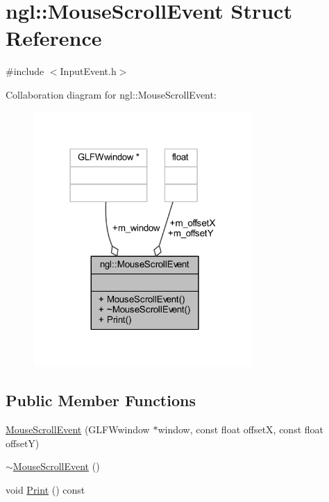 \hypertarget{structngl_1_1_mouse_scroll_event}{}\section{ngl\+:\+:Mouse\+Scroll\+Event Struct Reference}
\label{structngl_1_1_mouse_scroll_event}


{\ttfamily \#include $<$Input\+Event.\+h$>$}



Collaboration diagram for ngl\+:\+:Mouse\+Scroll\+Event\+:
\nopagebreak
\begin{figure}[H]
\begin{center}
\leavevmode
\includegraphics[width=237pt]{structngl_1_1_mouse_scroll_event__coll__graph}
\end{center}
\end{figure}
\subsection*{Public Member Functions}
\begin{DoxyCompactItemize}
\item 
\mbox{\hyperlink{structngl_1_1_mouse_scroll_event_a746ace21fdf81b759738e16c7990ab06}{Mouse\+Scroll\+Event}} (G\+L\+F\+Wwindow $\ast$window, const float offsetX, const float offsetY)
\item 
\mbox{\hyperlink{structngl_1_1_mouse_scroll_event_aa3891161095d29b520f1fb3c3ae015c3}{$\sim$\+Mouse\+Scroll\+Event}} ()
\item 
void \mbox{\hyperlink{structngl_1_1_mouse_scroll_event_afa728507f4f671e108504e3c88fef708}{Print}} () const
\end{DoxyCompactItemize}
